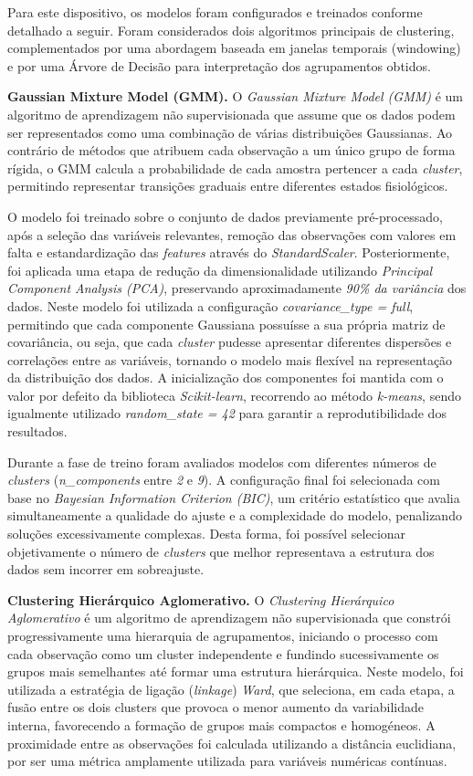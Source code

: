 Para este dispositivo, os modelos foram configurados e treinados conforme detalhado a seguir. Foram considerados dois algoritmos principais de clustering, complementados por uma abordagem baseada em janelas temporais (windowing) e por uma Árvore de Decisão para interpretação dos agrupamentos obtidos.

\textbf{Gaussian Mixture Model (GMM).} O \textit{Gaussian Mixture Model (GMM)} é um algoritmo de aprendizagem não supervisionada que assume que os dados podem ser representados como uma combinação de várias distribuições Gaussianas. Ao contrário de métodos que atribuem cada observação a um único grupo de forma rígida, o GMM calcula a probabilidade de cada amostra pertencer a cada \textit{cluster}, permitindo representar transições graduais entre diferentes estados fisiológicos.

O modelo foi treinado sobre o conjunto de dados previamente pré-processado, após a seleção das variáveis relevantes, remoção das observações com valores em falta e estandardização das \textit{features} através do \textit{StandardScaler}. Posteriormente, foi aplicada uma etapa de redução da dimensionalidade utilizando \textit{Principal Component Analysis (PCA)}, preservando aproximadamente \textit{90\% da variância} dos dados. Neste modelo foi utilizada a configuração \textit{covariance\_type = full}, permitindo que cada componente Gaussiana possuísse a sua própria matriz de covariância, ou seja, que cada \textit{cluster} pudesse apresentar diferentes dispersões e correlações entre as variáveis, tornando o modelo mais flexível na representação da distribuição dos dados. A inicialização dos componentes foi mantida com o valor por defeito da biblioteca \textit{Scikit-learn}, recorrendo ao método \textit{k-means}, sendo igualmente utilizado \textit{random\_state = 42} para garantir a reprodutibilidade dos resultados.

Durante a fase de treino foram avaliados modelos com diferentes números de \textit{clusters} (\textit{n\_components} entre \textit{2} e \textit{9}). A configuração final foi selecionada com base no \textit{Bayesian Information Criterion (BIC)}, um critério estatístico que avalia simultaneamente a qualidade do ajuste e a complexidade do modelo, penalizando soluções excessivamente complexas. Desta forma, foi possível selecionar objetivamente o número de \textit{clusters} que melhor representava a estrutura dos dados sem incorrer em sobreajuste.

\textbf{Clustering Hierárquico Aglomerativo.} O \textit{Clustering Hierárquico Aglomerativo} é um algoritmo de aprendizagem não supervisionada que constrói progressivamente uma hierarquia de agrupamentos, iniciando o processo com cada observação como um cluster independente e fundindo sucessivamente os grupos mais semelhantes até formar uma estrutura hierárquica. Neste modelo, foi utilizada a estratégia de ligação (\textit{linkage}) \textit{Ward}, que seleciona, em cada etapa, a fusão entre os dois clusters que provoca o menor aumento da variabilidade interna, favorecendo a formação de grupos mais compactos e homogéneos. A proximidade entre as observações foi calculada utilizando a distância euclidiana, por ser uma métrica amplamente utilizada para variáveis numéricas contínuas.

